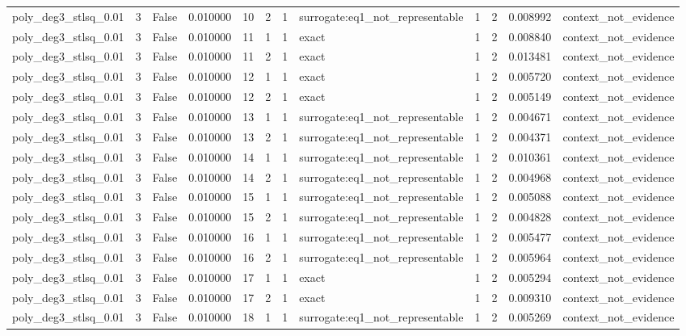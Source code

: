 \begin{tabular}{lrrrrrrlrrrl}
poly\_deg3\_stlsq\_0.01 & 3 & False & 0.010000 & 10 & 2 & 1 & surrogate:eq1\_not\_representable & 1 & 2 & 0.008992 & context\_not\_evidence \\
poly\_deg3\_stlsq\_0.01 & 3 & False & 0.010000 & 11 & 1 & 1 & exact & 1 & 2 & 0.008840 & context\_not\_evidence \\
poly\_deg3\_stlsq\_0.01 & 3 & False & 0.010000 & 11 & 2 & 1 & exact & 1 & 2 & 0.013481 & context\_not\_evidence \\
poly\_deg3\_stlsq\_0.01 & 3 & False & 0.010000 & 12 & 1 & 1 & exact & 1 & 2 & 0.005720 & context\_not\_evidence \\
poly\_deg3\_stlsq\_0.01 & 3 & False & 0.010000 & 12 & 2 & 1 & exact & 1 & 2 & 0.005149 & context\_not\_evidence \\
poly\_deg3\_stlsq\_0.01 & 3 & False & 0.010000 & 13 & 1 & 1 & surrogate:eq1\_not\_representable & 1 & 2 & 0.004671 & context\_not\_evidence \\
poly\_deg3\_stlsq\_0.01 & 3 & False & 0.010000 & 13 & 2 & 1 & surrogate:eq1\_not\_representable & 1 & 2 & 0.004371 & context\_not\_evidence \\
poly\_deg3\_stlsq\_0.01 & 3 & False & 0.010000 & 14 & 1 & 1 & surrogate:eq1\_not\_representable & 1 & 2 & 0.010361 & context\_not\_evidence \\
poly\_deg3\_stlsq\_0.01 & 3 & False & 0.010000 & 14 & 2 & 1 & surrogate:eq1\_not\_representable & 1 & 2 & 0.004968 & context\_not\_evidence \\
poly\_deg3\_stlsq\_0.01 & 3 & False & 0.010000 & 15 & 1 & 1 & surrogate:eq1\_not\_representable & 1 & 2 & 0.005088 & context\_not\_evidence \\
poly\_deg3\_stlsq\_0.01 & 3 & False & 0.010000 & 15 & 2 & 1 & surrogate:eq1\_not\_representable & 1 & 2 & 0.004828 & context\_not\_evidence \\
poly\_deg3\_stlsq\_0.01 & 3 & False & 0.010000 & 16 & 1 & 1 & surrogate:eq1\_not\_representable & 1 & 2 & 0.005477 & context\_not\_evidence \\
poly\_deg3\_stlsq\_0.01 & 3 & False & 0.010000 & 16 & 2 & 1 & surrogate:eq1\_not\_representable & 1 & 2 & 0.005964 & context\_not\_evidence \\
poly\_deg3\_stlsq\_0.01 & 3 & False & 0.010000 & 17 & 1 & 1 & exact & 1 & 2 & 0.005294 & context\_not\_evidence \\
poly\_deg3\_stlsq\_0.01 & 3 & False & 0.010000 & 17 & 2 & 1 & exact & 1 & 2 & 0.009310 & context\_not\_evidence \\
poly\_deg3\_stlsq\_0.01 & 3 & False & 0.010000 & 18 & 1 & 1 & surrogate:eq1\_not\_representable & 1 & 2 & 0.005269 & context\_not\_evidence \\

\end{tabular}
